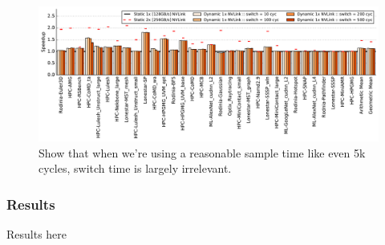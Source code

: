 \begin{figure}[tp]
    \centering
    \includegraphics[width=1.0\textwidth]{figures/plot_nvlink_switch_time_sample_time5000.pdf}
    \caption{Show that when we're using a reasonable sample time like even 5k 
cycles, switch time is largely irrelevant.}
    \label{fig:switchtime}
\end{figure}

\subsubsection{Results}
Results here

